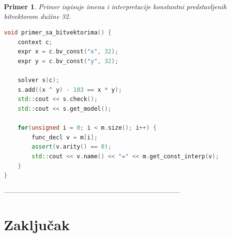 \documentclass[12pt,oneside]{memoir}
\newtheorem{primer}{Primer}
\begin{document}
\begin{primer} \label{ex6} Primer ispisuje imena i interpretacije konstantni predstavljenih bitvektorom dužine 32.
\begin{lstlisting}[language=C++]
void primer_sa_bitvektorima() {
    context c;
    expr x = c.bv_const("x", 32);
    expr y = c.bv_const("y", 32);

    solver s(c);
    s.add((x ^ y) - 103 == x * y);
    std::cout << s.check();
    std::cout << s.get_model();
    
    for(unsigned i = 0; i < m.size(); i++) {
        func_decl v = m[i];
        assert(v.arity() == 0); 
        std::cout << v.name() << "=" << m.get_const_interp(v);
    }
}

\end{lstlisting}
\end{primer}

------------------------------------------------------------------------------

\chapter{Zaključak}


\literatura

\backmatter

\begin{biografija}
  
\end{biografija}
\end{document}
